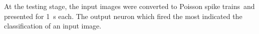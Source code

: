 	At the testing stage, the input images were converted to Poisson spike trains~\DIFdelbegin {}\DIFdelend \DIFaddbegin {}\DIFaddend and presented for 1~s each.
	The output neuron which fired the most indicated the classification of an input image.
%	
%	

	
